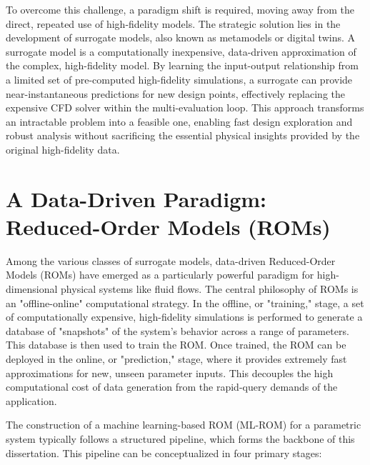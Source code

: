 \documentclass[dscexam, EN]{ufabcFHZh}
\begin{document}
To overcome this challenge, a paradigm shift is required, moving away from the direct, repeated use of high-fidelity models. The strategic solution lies in the development of surrogate models, also known as metamodels or digital twins. A surrogate model is a computationally inexpensive, data-driven approximation of the complex, high-fidelity model. By learning the input-output relationship from a limited set of pre-computed high-fidelity simulations, a surrogate can provide near-instantaneous predictions for new design points, effectively replacing the expensive CFD solver within the multi-evaluation loop. This approach transforms an intractable problem into a feasible one, enabling fast design exploration and robust analysis without sacrificing the essential physical insights provided by the original high-fidelity data.


\section{A Data-Driven Paradigm: Reduced-Order Models (ROMs)}

Among the various classes of surrogate models, data-driven Reduced-Order Models (ROMs) have emerged as a particularly powerful paradigm for high-dimensional physical systems like fluid flows. The central philosophy of ROMs is an "offline-online" computational strategy. In the offline, or "training," stage, a set of computationally expensive, high-fidelity simulations is performed to generate a database of "snapshots" of the system's behavior across a range of parameters. This database is then used to train the ROM. Once trained, the ROM can be deployed in the online, or "prediction," stage, where it provides extremely fast approximations for new, unseen parameter inputs. This decouples the high computational cost of data generation from the rapid-query demands of the application.

The construction of a machine learning-based ROM (ML-ROM) for a parametric system typically follows a structured pipeline, which forms the backbone of this dissertation. This pipeline can be conceptualized in four primary stages:
\end{document}
